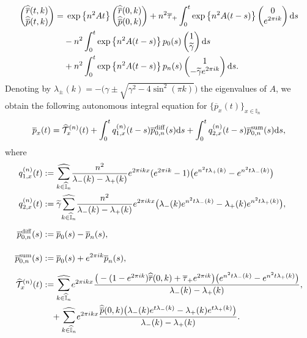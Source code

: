 \documentclass[EJP]{ejpecp} %
\newcommand\T{{\mathbb I}}
\newcommand \ga{\gamma}
\newcommand \la{\lambda}
\newcommand{\dd  }{\mathrm{d}}
\renewcommand{\hat}{\widehat}
\renewcommand{\tilde}{\widetilde}
\renewcommand{\bar}{\overline}
\numberwithin{equation}{section}
\begin{document}
\begin{align}
  \label{eq:rev-sys-mild}
 \begin{pmatrix}
\widehat{\bar r}(t,k)\\
\widehat{\bar p}(t,k)
 \end{pmatrix}
   = & \; \exp\left\{ n^2A t\right\} \begin{pmatrix}
\widehat{\bar r}(0,k) \notag \\
\widehat{\bar p}(0,k)
 \end{pmatrix}+n^2 \bar \tau_+\int_0^t \exp\left\{ n^2A (t-s)\right\}\begin{pmatrix}
0\\ 
e^{2\pi i  k}
 \end{pmatrix}\dd s\\
&
-n^2 \int_0^t \exp\left\{ n^2A (t-s)\right\} p_0(s) \begin{pmatrix}
1\\
\tilde\gamma
 \end{pmatrix} \dd s \notag\\ & + n^2\int_0^t \exp\left\{ n^2A (t-s)\right\} p_n(s) \begin{pmatrix}
1\\
-\tilde\gamma e^{2\pi i  k}
 \end{pmatrix} \dd s.\end{align}
Denoting by 
$ \lambda_\pm(k)=-\big(\ga\pm\sqrt{\ga^2-4\sin^2(\pi k)}\big)$ the eigenvalues of $A$, 
we obtain the following autonomous integral equation for $\{\bar p_x(t)\}_{x\in\T_n}$
\begin{equation}
  \label{070411-19x}
\bar p_x(t)
   =\hat{\cal T}^{(n)}_x(t)+\int_0^tq_{1,x}^{(n)}(t-s) \bar
    p_{0,n}^{\rm diff}(s) \dd s+\int_0^tq_{2,x}^{(n)}(t-s) \bar
    p_{0,n}^{\rm sum}(s) \dd s,
    \end{equation}
    where
    \begin{align*}
q_{1,x}^{(n)}(t)&:=\underset{{k\in \widehat{\T}_n}}{{\hat\sum}}\frac{n^2 }{\la_-(k)-\la_+(k) } e^{2\pi ik x} (e^{2\pi ik}-1)\big(e^{n^2t\la_+(k)}-
                            e^{n^2t\la_-(k)}\big)\\
q_{2,x}^{(n)}(t)&:=\tilde \ga \underset{{k\in \widehat{\T}_n}}{{\hat\sum}}\frac{n^2 }{\la_-(k)-\la_+(k) } e^{2\pi ik x}  \big(\la_-(k)e^{n^2t\la_-(k)}-
                                             \la_+(k)e^{n^2 t\la_+(k)}\big),\\
\bar p_{0,n}^{\rm diff}(s)&:= \bar p_0(s) -\bar p_n(s), \vphantom{\bigg(}\\
\bar p_{0,n}^{\rm sum}(s)&:= \bar p_0(s) +e^{2\pi i  k}\bar p_n(s),\vphantom{\bigg(}
 \\
\hat{\cal T}^{(n)}_x(t)&:=\underset{{k\in \widehat{\T}_n}}{{\hat\sum}}e^{2\pi ik x} \frac{\big(-(1-e^{2\pi ik})\hat{ \bar r}(0,k)+\bar \tau_+  e^{2\pi i  k}\big)\big(e^{n^2 t\la_-(k)}- e^{n^2  t\la_+(k)}\big)}{\la_-(k)-\la_+(k)},\\
& \quad 
+\underset{{k\in \widehat{\T}_n}}{{\hat\sum}}e^{2\pi ik x} \frac{\hat{ \bar p}(0,k) \big(\la_-(k)e^{t\la_-(k)}-
                                             \la_+(k)e^{t\la_+(k)}\big)}{\la_-(k)-\la_+(k)}.
\end{align*}
\end{document}
